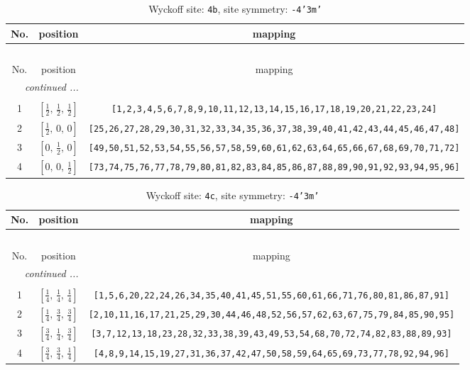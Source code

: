 \documentclass[fleqn,8pt]{jsarticle}
\begin{document}
\begin{longtable}{ccc}
\caption{Wyckoff site: {\tt 4b}, site symmetry: {\tt -4'3m'}}
 \\
 \hline \hline
No. & position & mapping \\ \hline \endfirsthead

\multicolumn{2}{l}{\tablename\ \thetable{}} \\
 \hline \hline
No. & position & mapping \\ \hline \endhead

 \hline \hline
\multicolumn{2}{r}{\footnotesize\it continued ...} \\ \endfoot

 \hline \hline
\multicolumn{2}{r}{} \\ \endlastfoot

1 & $\left[ \frac{1}{2},\, \frac{1}{2},\, \frac{1}{2} \right]$ & {\tt [1,2,3,4,5,6,7,8,9,10,11,12,13,14,15,16,17,18,19,20,21,22,23,24]} \\ \hline
2 & $\left[ \frac{1}{2},\, 0,\, 0 \right]$ & {\tt [25,26,27,28,29,30,31,32,33,34,35,36,37,38,39,40,41,42,43,44,45,46,47,48]} \\ \hline
3 & $\left[ 0,\, \frac{1}{2},\, 0 \right]$ & {\tt [49,50,51,52,53,54,55,56,57,58,59,60,61,62,63,64,65,66,67,68,69,70,71,72]} \\ \hline
4 & $\left[ 0,\, 0,\, \frac{1}{2} \right]$ & {\tt [73,74,75,76,77,78,79,80,81,82,83,84,85,86,87,88,89,90,91,92,93,94,95,96]} \\
\end{longtable}
\renewcommand{\arraystretch}{1.2}
\begin{longtable}{ccc}
\caption{Wyckoff site: {\tt 4c}, site symmetry: {\tt -4'3m'}}
 \\
 \hline \hline
No. & position & mapping \\ \hline \endfirsthead

\multicolumn{2}{l}{\tablename\ \thetable{}} \\
 \hline \hline
No. & position & mapping \\ \hline \endhead

 \hline \hline
\multicolumn{2}{r}{\footnotesize\it continued ...} \\ \endfoot

 \hline \hline
\multicolumn{2}{r}{} \\ \endlastfoot

1 & $\left[ \frac{1}{4},\, \frac{1}{4},\, \frac{1}{4} \right]$ & {\tt [1,5,6,20,22,24,26,34,35,40,41,45,51,55,60,61,66,71,76,80,81,86,87,91]} \\ \hline
2 & $\left[ \frac{1}{4},\, \frac{3}{4},\, \frac{3}{4} \right]$ & {\tt [2,10,11,16,17,21,25,29,30,44,46,48,52,56,57,62,63,67,75,79,84,85,90,95]} \\ \hline
3 & $\left[ \frac{3}{4},\, \frac{1}{4},\, \frac{3}{4} \right]$ & {\tt [3,7,12,13,18,23,28,32,33,38,39,43,49,53,54,68,70,72,74,82,83,88,89,93]} \\ \hline
4 & $\left[ \frac{3}{4},\, \frac{3}{4},\, \frac{1}{4} \right]$ & {\tt [4,8,9,14,15,19,27,31,36,37,42,47,50,58,59,64,65,69,73,77,78,92,94,96]} \\
\end{longtable}
\end{document}
